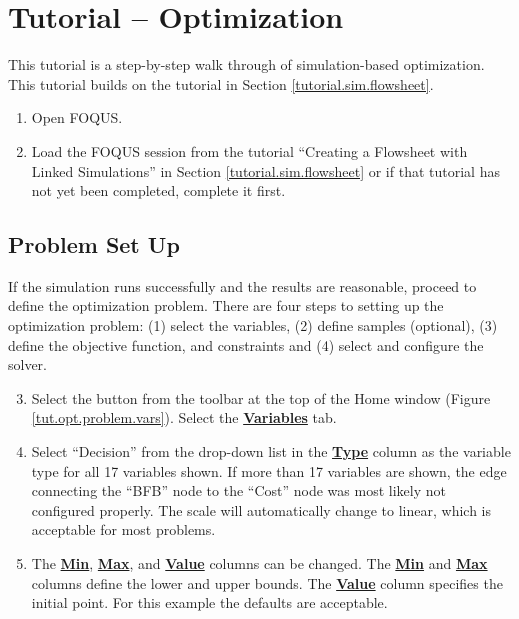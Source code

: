 \section{Tutorial -- Optimization}\label{sec.opt.tutorial}

This tutorial is a step-by-step walk through of simulation-based optimization. This tutorial builds on the tutorial in Section \ref{tutorial.sim.flowsheet}.

\begin{enumerate}
	\item Open FOQUS.
	\item Load the FOQUS session from the tutorial ``Creating a Flowsheet with Linked Simulations'' in Section  \ref{tutorial.sim.flowsheet} or if that tutorial has not yet been completed, complete it first.
\end{enumerate}

\subsection{Problem Set Up}
If the simulation runs successfully and the results are reasonable, proceed to define the optimization problem. There are four steps to setting up the optimization problem: (1) select the variables, (2) define samples (optional), (3) define the objective function, and constraints and (4) select and configure the solver.

\begin{enumerate}
	\setcounter{enumi}{2}
	\item Select the  button from the toolbar at the top of the Home window (Figure \ref{tut.opt.problem.vars}).  Select the \textbf{\underline{Variables}} tab.
	\item Select ``Decision'' from the drop-down list in the \textbf{\underline{Type}} column as the variable type for all 17 variables shown. If more than 17 variables are shown, the edge connecting the ``BFB'' node to the ``Cost'' node was most likely not configured properly. The scale will automatically change to linear, which is acceptable for most problems.
	\item The \textbf{\underline{Min}}, \textbf{\underline{Max}}, and \textbf{\underline{Value}} columns can be changed. The \textbf{\underline{Min}} and \textbf{\underline{Max}} columns define the lower and upper bounds. The \textbf{\underline{Value}} column specifies the initial point. For this example the defaults are acceptable.
\end{enumerate}

